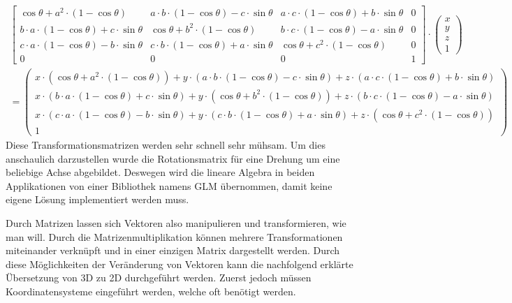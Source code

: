 \documentclass[titlepage, 11pt, a4paper, ngerman]{article}
\begin{document}
\begin{align*}
    \begin{bmatrix}
    \cos{\theta} + a^{2} \cdot (1 - \cos{\theta}) & a \cdot b \cdot (1 - \cos{\theta}) - c \cdot \sin{\theta} & a \cdot c \cdot (1 - \cos{\theta}) + b \cdot \sin{\theta} & 0 \\
    b \cdot a \cdot (1 - \cos{\theta}) + c \cdot \sin{\theta} & \cos{\theta} + b^{2} \cdot (1 - \cos{\theta}) & b \cdot c \cdot (1 - \cos{\theta}) - a \cdot \sin{\theta} & 0 \\
    c \cdot a \cdot (1 - \cos{\theta}) - b \cdot \sin{\theta} & c \cdot b \cdot (1 - \cos{\theta}) + a \cdot \sin{\theta} & \cos{\theta} + c^{2} \cdot (1 - \cos{\theta}) & 0 \\
    0 & 0 & 0 & 1
    \end{bmatrix} \cdot
    \begin{pmatrix}
    x \\ y \\ z \\ 1
    \end{pmatrix} \\ =
    \begin{pmatrix}
    x \cdot (\cos{\theta} + a^{2} \cdot (1 - \cos{\theta})) + y \cdot (a \cdot b \cdot (1 - \cos{\theta}) - c \cdot \sin{\theta}) + z \cdot (a \cdot c \cdot (1 - \cos{\theta}) + b \cdot \sin{\theta}) \\
    x \cdot (b \cdot a \cdot (1 - \cos{\theta}) + c \cdot \sin{\theta}) + y \cdot (\cos{\theta} + b^{2} \cdot (1 - \cos{\theta})) + z \cdot (b \cdot c \cdot (1 - \cos{\theta}) - a \cdot \sin{\theta}) \\
    x \cdot (c \cdot a \cdot (1 - \cos{\theta}) - b \cdot \sin{\theta}) + y \cdot (c \cdot b \cdot (1 - \cos{\theta}) + a \cdot \sin{\theta}) + z \cdot (\cos{\theta} + c^{2} \cdot (1 - \cos{\theta})) \\
    1
    \end{pmatrix}
\end{align*}
\bigbreak
Diese Transformationsmatrizen werden sehr schnell sehr mühsam. Um dies anschaulich darzustellen wurde die Rotationsmatrix für eine Drehung um eine beliebige Achse abgebildet. Deswegen wird die lineare Algebra in beiden Applikationen von einer Bibliothek namens \acrfull{GLM} übernommen, damit keine eigene Lösung implementiert werden muss.\par
Durch Matrizen lassen sich Vektoren also manipulieren und transformieren, wie man will. Durch die Matrizenmultiplikation können mehrere Transformationen miteinander verknüpft und in einer einzigen Matrix dargestellt werden. Durch diese Möglichkeiten der Veränderung von Vektoren kann die nachfolgend erklärte Übersetzung von 3D zu 2D durchgeführt werden. Zuerst jedoch müssen Koordinatensysteme eingeführt werden, welche oft benötigt werden.
\end{document}
